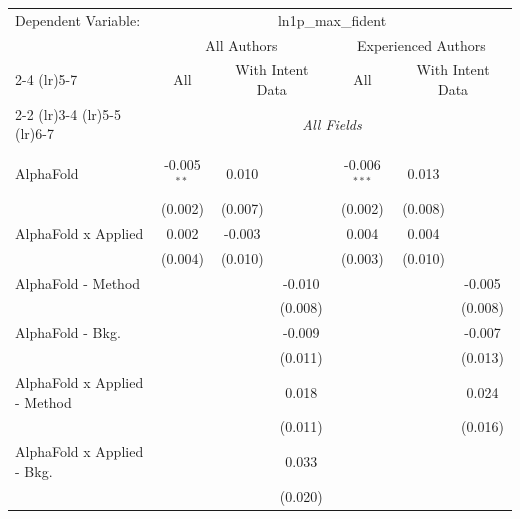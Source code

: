 \begingroup
\centering
\begin{tabular}{lcccccc}
   \tabularnewline \midrule \midrule
   Dependent Variable: & \multicolumn{6}{c}{ln1p\_max\_fident}\\
 & \multicolumn{3}{c}{All Authors} & \multicolumn{3}{c}{Experienced Authors} \\
\cmidrule(lr){2-4} \cmidrule(lr){5-7}
 & \multicolumn{1}{c}{All} & \multicolumn{2}{c}{With Intent Data} & \multicolumn{1}{c}{All} & \multicolumn{2}{c}{With Intent Data} \\
\cmidrule(lr){2-2} \cmidrule(lr){3-4} \cmidrule(lr){5-5} \cmidrule(lr){6-7}
 & \multicolumn{6}{c}{\textit{All Fields}} \\ \\
   AlphaFold                      & -0.005$^{**}$ & 0.010        &          & -0.006$^{***}$ & 0.013        &   \\   
                                  & (0.002)       & (0.007)      &          & (0.002)        & (0.008)      &   \\   
   AlphaFold x Applied            & 0.002         & -0.003       &          & 0.004          & 0.004        &   \\   
                                  & (0.004)       & (0.010)      &          & (0.003)        & (0.010)      &   \\   
   AlphaFold - Method             &               &              & -0.010   &                &              & -0.005\\   
                                  &               &              & (0.008)  &                &              & (0.008)\\   
   AlphaFold - Bkg.               &               &              & -0.009   &                &              & -0.007\\   
                                  &               &              & (0.011)  &                &              & (0.013)\\   
   AlphaFold x Applied - Method   &               &              & 0.018    &                &              & 0.024\\   
                                  &               &              & (0.011)  &                &              & (0.016)\\   
   AlphaFold x Applied - Bkg.     &               &              & 0.033    &                &              &   \\   
                                  &               &              & (0.020)  &                &              &   \\   

\end{tabular}
